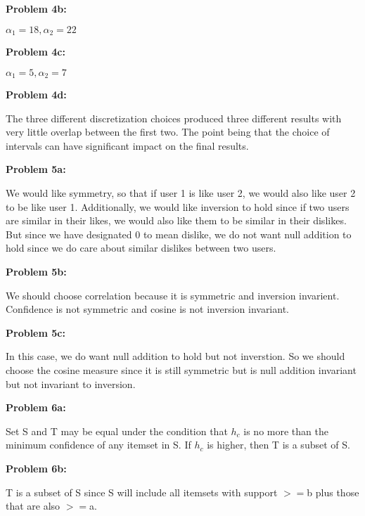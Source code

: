 \documentclass[11pt]{article}
\numberwithin{equation}{section}  %
\begin{document}
\noindent\textbf{Problem 4b: }

\noindent $\alpha_1=18,\alpha_2=22$
\vspace*{0.25in}

\noindent\textbf{Problem 4c: }

\noindent $\alpha_1=5,\alpha_2=7$
\vspace*{0.25in}

\noindent\textbf{Problem 4d: }

\noindent The three different discretization choices produced three different results with very little overlap between the first two. The point being that the choice of intervals can have significant impact on the final results.
\vspace*{0.25in}

\noindent\textbf{Problem 5a: }

\noindent We would like symmetry, so that if user 1 is like user 2, we would also like user 2 to be like user 1. Additionally, we would like inversion to hold since if two users are similar in their likes, we would also like them to be similar in their dislikes. But since we have designated 0 to mean dislike, we do not want null addition to hold since we do care about similar dislikes between two users.
\vspace*{0.25in}

\noindent\textbf{Problem 5b: }

\noindent We should choose correlation because it is symmetric and inversion invarient. Confidence is not symmetric and cosine is not inversion invariant.
\vspace*{0.25in}

\noindent\textbf{Problem 5c: }

\noindent In this case, we do want null addition to hold but not inverstion. So we should choose the cosine measure since it is still symmetric but is null addition invariant but not invariant to inversion.
\vspace*{0.25in}

\noindent\textbf{Problem 6a: }

\noindent Set S and T may be equal under the condition that $h_c$ is no more than the minimum confidence of any itemset in S. If $h_c$ is higher, then T is a subset of S.
\vspace*{0.25in}

\noindent\textbf{Problem 6b: }

\noindent T is a subset of S since S will include all itemsets with support $>=$b plus those that are also $>=$a.
\vspace*{0.25in}
\end{document}
